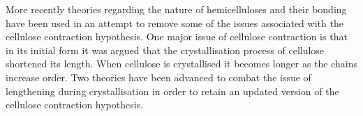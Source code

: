 More recently theories regarding the nature of hemicelluloses and their bonding
have been used in an attempt to remove some of the issues associated with the
cellulose contraction hypothesis. One major issue of cellulose contraction is
that in its initial form it was argued that the crystallisation process of cellulose
shortened its length. When cellulose is crystallised it becomes
longer as the chains increase order. Two theories have been advanced to combat
the issue of lengthening during crystallisation in order to retain an updated
version of the cellulose contraction hypothesis.